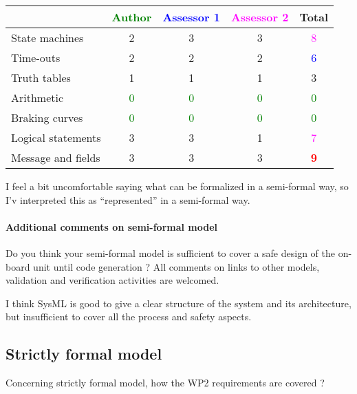 \begin{tabular}{|l | c | c | c | c|}
\hline
& \textcolor{green}{Author} & \textcolor{blue}{Assessor 1} & \textcolor{magenta}{Assessor 2} & Total \\
\hline
State machines & 2     & 3     & 3     & \textcolor{magenta}{8} \\
\hline
Time-outs & 2     & 2     & 2     & \textcolor{blue}{6} \\
\hline
Truth tables & 1     & 1     & 1     & 3     \\
\hline
Arithmetic & \textcolor{green}{0} & \textcolor{green}{0} & \textcolor{green}{0} & \textcolor{green}{0} \\
\hline
Braking curves & \textcolor{green}{0} & \textcolor{green}{0} & \textcolor{green}{0} & \textcolor{green}{0} \\
\hline
Logical statements & 3     & 3     & 1     & \textcolor{magenta}{7} \\
\hline
Message and fields & 3     & 3     & 3     & \textcolor{red}{\textbf{9}} \\
\hline
\end{tabular}

\begin{assessor1}
I feel a bit uncomfortable saying what can be formalized in a semi-formal way, so I'v interpreted this as "`represented"' in a semi-formal way. 
\end{assessor1}

\paragraph{Additional comments on semi-formal model} Do you think your semi-formal model is sufficient to cover a safe design of the on-board unit until code generation ?
All comments on links to other models, validation and verification activities are welcomed.


\begin{assessor2}
I think SysML is good to give a clear structure of the system and its architecture, but insufficient to cover all the process and safety aspects.
\end{assessor2}

\subsection{Strictly formal model}

Concerning strictly formal model, how the WP2 requirements are covered ?

